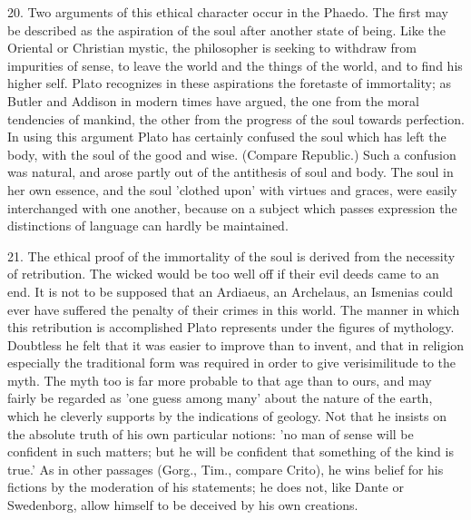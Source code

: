 20. Two arguments of this ethical character occur in the Phaedo. The first
may be described as the aspiration of the soul after another state of
being. Like the Oriental or Christian mystic, the philosopher is seeking
to withdraw from impurities of sense, to leave the world and the things of
the world, and to find his higher self. Plato recognizes in these
aspirations the foretaste of immortality; as Butler and Addison in modern
times have argued, the one from the moral tendencies of mankind, the other
from the progress of the soul towards perfection. In using this argument
Plato has certainly confused the soul which has left the body, with the
soul of the good and wise. (Compare Republic.) Such a confusion was
natural, and arose partly out of the antithesis of soul and body. The soul
in her own essence, and the soul 'clothed upon' with virtues and graces,
were easily interchanged with one another, because on a subject which
passes expression the distinctions of language can hardly be maintained.

21. The ethical proof of the immortality of the soul is derived from the
necessity of retribution. The wicked would be too well off if their evil
deeds came to an end. It is not to be supposed that an Ardiaeus, an
Archelaus, an Ismenias could ever have suffered the penalty of their
crimes in this world. The manner in which this retribution is accomplished
Plato represents under the figures of mythology. Doubtless he felt that it
was easier to improve than to invent, and that in religion especially the
traditional form was required in order to give verisimilitude to the myth.
The myth too is far more probable to that age than to ours, and may fairly
be regarded as 'one guess among many' about the nature of the earth, which
he cleverly supports by the indications of geology. Not that he insists on
the absolute truth of his own particular notions: 'no man of sense will be
confident in such matters; but he will be confident that something of the
kind is true.' As in other passages (Gorg., Tim., compare Crito), he wins
belief for his fictions by the moderation of his statements; he does not,
like Dante or Swedenborg, allow himself to be deceived by his own
creations.

